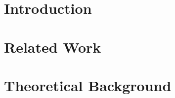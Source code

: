 \documentclass[12pt]{report}
\begin{document}

\setmainfont{Times New Roman}

\clearpage
{}












\listoftables
\newpage

\listoffigures
\newpage


\chapter{Introduction}
\label{chapter:intro}






\chapter{Related Work}
\label{chapter:related}






\chapter{Theoretical Background}
\label{chapter:foundations}








\end{document}
